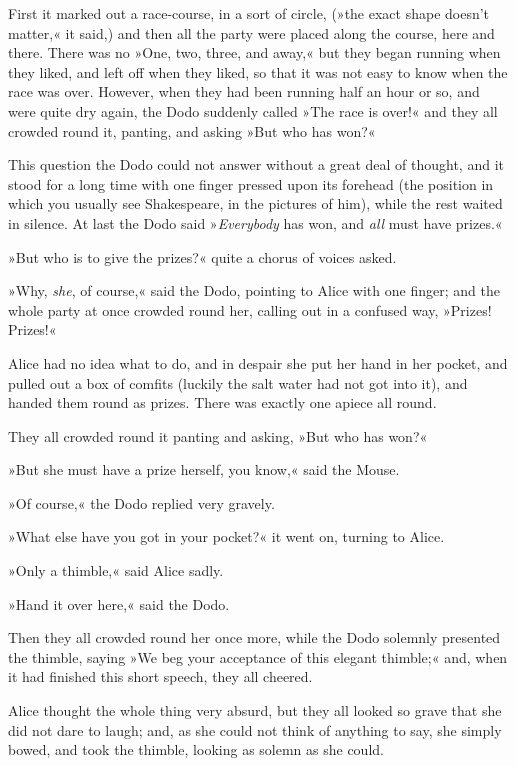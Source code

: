 First it marked out a race-course, in a sort of circle, (»the exact shape doesn't matter,« it said,) and then all the party were placed along the course, here and there. There was no »One, two, three, and away,« but they began running when they liked, and left off when they liked, so that it was not easy to know when the race was over. However, when they had been running half an hour or so, and were quite dry again, the Dodo suddenly called »The race is over!« and they all crowded round it, panting, and asking »But who has won?«



This question the Dodo could not answer without a great deal of thought, and it stood for a long time with one finger pressed upon its forehead (the position in which you usually see Shakespeare, in the pictures of him), while the rest waited in silence. At last the Dodo said »\textit{Everybody} has won, and \textit{all} must have prizes.«

»But who is to give the prizes?« quite a chorus of voices asked.

»Why, \textit{she}, of course,« said the Dodo, pointing to Alice with one finger; and the whole party at once crowded round her, calling out in a confused way, »Prizes! Prizes!«

Alice had no idea what to do, and in despair she put her hand in her pocket, and pulled out a box of comfits (luckily the salt water had not got into it), and handed them round as prizes. There was exactly one apiece all round.

They all crowded round it panting and asking, »But who has won?«


»But she must have a prize herself, you know,« said the Mouse.

»Of course,« the Dodo replied very gravely.

»What else have you got in your pocket?« it went on, turning to Alice.

»Only a thimble,« said Alice sadly.

»Hand it over here,« said the Dodo.

Then they all crowded round her once more, while the Dodo solemnly presented the thimble, saying »We beg your acceptance of this elegant thimble;« and, when it had finished this short speech, they all cheered.

Alice thought the whole thing very absurd, but they all looked so grave that she did not dare to laugh; and, as she could not think of anything to say, she simply bowed, and took the thimble, looking as solemn as she could.

